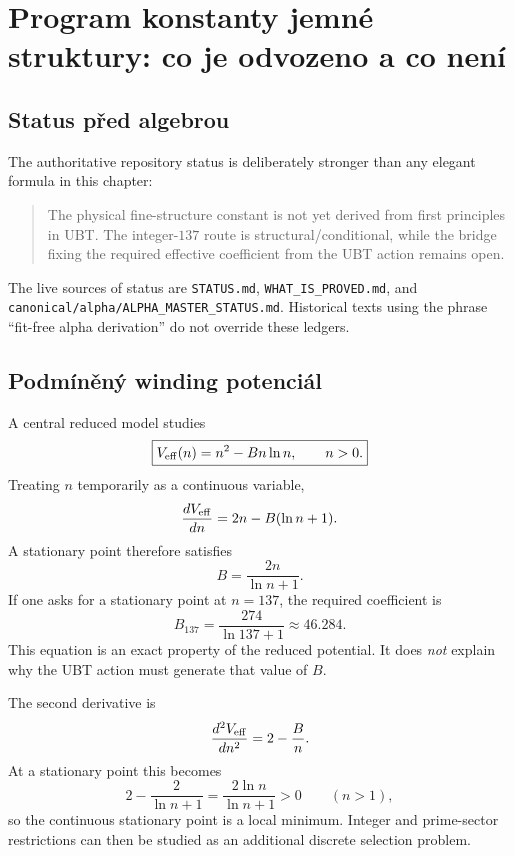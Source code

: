 
\chapter{Program konstanty jemné struktury: co je odvozeno a co není}
\label{ch:alpha}

\section{Status před algebrou}
The authoritative repository status is deliberately stronger than any elegant
formula in this chapter:
\begin{quote}
The physical fine-structure constant is not yet derived from first principles
in UBT.  The integer-$137$ route is structural/conditional, while the bridge
fixing the required effective coefficient from the UBT action remains open.
\end{quote}
The live sources of status are \texttt{STATUS.md},
\texttt{WHAT\_IS\_PROVED.md}, and
\texttt{canonical/alpha/ALPHA\_MASTER\_STATUS.md}.  Historical texts using the
phrase ``fit-free alpha derivation'' do not override these ledgers.

\section{Podmíněný winding potenciál}
A central reduced model studies
\[
 \boxed{V_{\rm eff}(n)=n^2-Bn\ln n,\qquad n>0.}
\]
Treating $n$ temporarily as a continuous variable,
\[
 \frac{dV_{\rm eff}}{dn}
 =2n-B(\ln n+1).
\]
A stationary point therefore satisfies
\[
 \boxed{B=\frac{2n}{\ln n+1}.}
\]
If one asks for a stationary point at $n=137$, the required coefficient is
\[
 B_{137}=\frac{274}{\ln137+1}\approx46.284.
\]
This equation is an exact property of the reduced potential.  It does
\emph{not} explain why the UBT action must generate that value of $B$.

The second derivative is
\[
 \frac{d^2V_{\rm eff}}{dn^2}=2-\frac{B}{n}.
\]
At a stationary point this becomes
\[
 2-\frac{2}{\ln n+1}
 =\frac{2\ln n}{\ln n+1}>0
 \qquad(n>1),
\]
so the continuous stationary point is a local minimum.  Integer and
prime-sector restrictions can then be studied as an additional discrete
selection problem.

